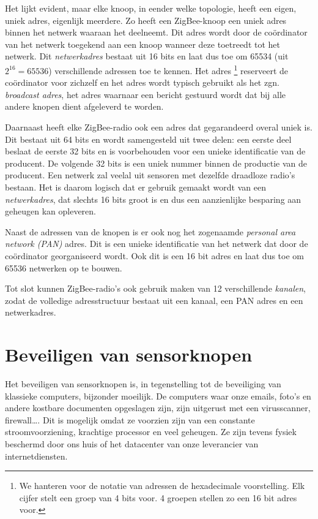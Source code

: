 Het lijkt evident, maar elke knoop, in eender welke topologie, heeft een eigen,
uniek adres, eigenlijk meerdere. Zo heeft een ZigBee-knoop een uniek adres
binnen het netwerk waaraan het deelneemt. Dit adres wordt door de co\"ordinator
van het netwerk toegekend aan een knoop wanneer deze toetreedt tot het netwerk.
Dit \emph{netwerkadres} bestaat uit 16 bits en laat dus toe om 65534 (uit
$2^{16} = 65536$) verschillende adressen toe te kennen. Het adres
\footnote{We hanteren voor de notatie van adressen de hexadecimale
voorstelling. Elk cijfer stelt een groep van 4 bits voor. 4 groepen stellen zo
een 16 bit adres voor.} reserveert de co\"ordinator voor zichzelf en het adres
 wordt typisch gebruikt als het zgn. \emph{broadcast adres}, het
adres waarnaar een bericht gestuurd wordt dat bij alle andere knopen dient
afgeleverd te worden.

Daarnaast heeft elke ZigBee-radio ook een adres dat gegarandeerd overal uniek
is. Dit bestaat uit 64 bits en wordt samengesteld uit twee delen: een eerste
deel beslaat de eerste 32 bits en is voorbehouden voor een unieke identificatie
van de producent. De volgende 32 bits is een uniek nummer binnen de productie
van de producent. Een netwerk zal veelal uit sensoren met dezelfde draadloze
radio's bestaan. Het is daarom logisch dat er gebruik gemaakt wordt van een
\emph{netwerkadres}, dat slechts 16 bits groot is en dus een aanzienlijke
besparing aan geheugen kan opleveren.

Naast de adressen van de knopen is er ook nog het zogenaamde \emph{personal
area network (PAN)} adres. Dit is een unieke identificatie van het netwerk dat
door de co\"ordinator georganiseerd wordt. Ook dit is een 16 bit adres en laat
dus toe om 65536 netwerken op te bouwen.

Tot slot kunnen ZigBee-radio's ook gebruik maken van 12 verschillende
\emph{kanalen}, zodat de volledige adresstructuur bestaat uit een kanaal, een
PAN adres en een netwerkadres.

\section{Beveiligen van sensorknopen}
\label{section:beveiligen}

Het beveiligen van sensorknopen is, in tegenstelling tot de beveiliging van
klassieke computers, bijzonder moeilijk. De computers waar onze emails, foto's
en andere kostbare documenten opgeslagen zijn, zijn uitgerust met een
virusscanner, firewall\dots. Dit is mogelijk omdat ze voorzien zijn van een
constante stroomvoorziening, krachtige processor en veel geheugen. Ze zijn
tevens fysiek beschermd door ons huis of het datacenter van onze leverancier
van internetdiensten.

